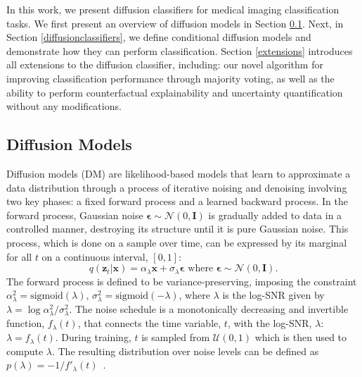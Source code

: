 In this work, we present diffusion classifiers for medical imaging classification tasks. We first present an overview of diffusion models in Section \ref{diffusion}. Next, in Section \ref{diffusionclassifiers}, we define conditional diffusion models and demonstrate how they can perform classification. Section \ref{extensions} introduces all extensions to the diffusion classifier, including: our novel algorithm for improving classification performance through majority voting, as well as the ability to perform counterfactual explainability and uncertainty quantification without any modifications.%


\subsection{Diffusion Models}\label{diffusion}

Diffusion models (DM) are likelihood-based models that learn to approximate a data distribution through a process of iterative noising and denoising involving two key phases: a fixed forward process and a learned backward process. In the forward process, Gaussian noise $\bm{\epsilon} \sim \mathcal{N}(0, \bm{\text{I}})$ is gradually added to data in a controlled manner, destroying its structure until it is pure Gaussian noise. 
This process, which is done on a sample over time, can be expressed by its marginal for all $t$ on a continuous interval, $[0,1]$:
\begin{equation}
    q(\bm{z}_{t}|\bm{x}) = \alpha_\lambda \bm{x} + \sigma_\lambda \bm{\epsilon} \text{ where } \bm{\epsilon} \sim \mathcal{N}(0, \bm{\text{I}}).\label{reparameterized_marginal}
\end{equation}
The forward process %
is defined to be variance-preserving, imposing the constraint $\alpha_\lambda^2 = \text{sigmoid}(\lambda)$, $\sigma_\lambda^2=\text{sigmoid}(-\lambda)$, where $\lambda$ is the log-SNR given by $\lambda = \log \alpha_\lambda^2/\sigma_\lambda^2$. The noise schedule is a monotonically decreasing and invertible function, $f_\lambda(t)$, that connects the time variable, $t$, with the log-SNR, $\lambda$: $\lambda= f_\lambda(t)$. During training, $t$ is sampled from $\mathcal{U}(0,1)$ which is then used to compute $\lambda$. The resulting distribution over noise levels can be defined as $p(\lambda)=-1/f'_\lambda(t)$~\cite{kingma2023understandingdiffusionobjectiveselbo}.%

